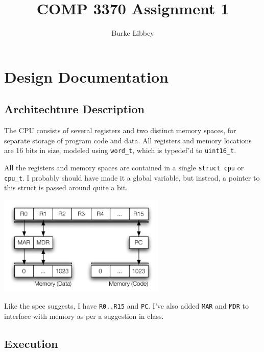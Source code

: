 \documentclass[11pt,letterpaper]{article}
\begin{document}
\author{Burke Libbey}
\title{COMP 3370 Assignment 1}

\maketitle

\section{Design Documentation}

\subsection{Architechture Description}

The CPU consists of several registers and two distinct memory spaces, for separate storage of program code and data. All registers and memory locations are 16 bits in size, modeled using \texttt{word\_t}, which is typedef'd to \texttt{uint16\_t}.

All the registers and memory spaces are contained in a single \texttt{struct cpu} or \texttt{cpu\_t}. I probably should have made it a global variable, but instead, a pointer to this struct is passed around quite a bit.

\hspace{20mm}\includegraphics[width=80mm]{datapath.pdf}
 
Like the spec suggests, I have \texttt{R0..R15} and \texttt{PC}. I've also added \texttt{MAR} and \texttt{MDR} to interface with memory as per a suggestion in class.

\newpage

\subsection{Execution}
\end{document}
